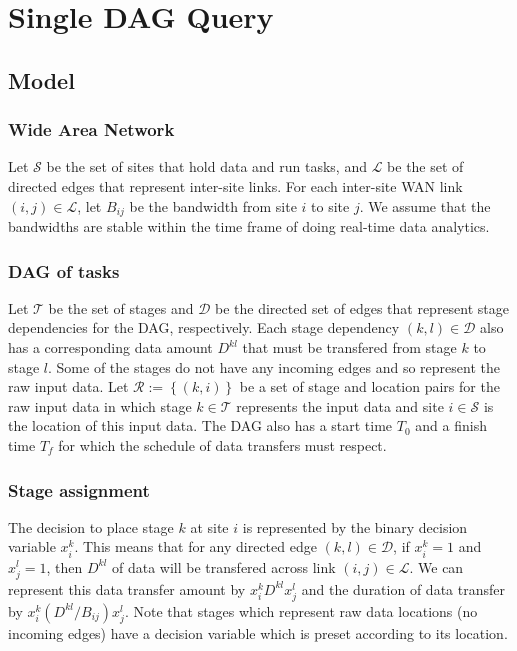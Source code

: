 \section{Single DAG Query}

\subsection{Model}

\subsubsection*{Wide Area Network}

Let $\mathcal{S}$ be the set of sites that hold data and run tasks, and $\mathcal{L}$ be the set of directed edges that represent inter-site links.
For each inter-site WAN link $(i,j)\in\mathcal{L}$, let $B_{ij}$ be the bandwidth from site $i$ to site $j$.
We assume that the bandwidths are stable within the time frame of doing real-time data analytics.

\subsubsection*{DAG of tasks}

Let $\mathcal{T}$ be the set of stages and $\mathcal{D}$ be the directed set of edges that represent stage dependencies for the DAG, respectively.
Each stage dependency $(k,l)\in\mathcal{D}$ also has a corresponding data amount $D^{kl}$ that must be transfered from stage $k$ to stage $l$.
Some of the stages do not have any incoming edges and so represent the raw input data.
Let $\mathcal{R}:=\left\{(k,i)\right\}$ be a set of stage and location pairs for the raw input data in which stage $k\in\mathcal{T}$ represents the input data and site $i\in\mathcal{S}$ is the location of this input data.
The DAG also has a start time $T_0$ and a finish time $T_f$ for which the schedule of data transfers must respect.

\subsubsection*{Stage assignment}

The decision to place stage $k$ at site $i$ is represented by the binary decision variable $x_i^k$.
This means that for any directed edge $(k,l)\in\mathcal{D}$, if $x_i^k=1$ and $x_j^l=1$, then $D^{kl}$ of data will be transfered across link $(i,j)\in\mathcal{L}$.
We can represent this data transfer amount by $x_i^kD^{kl}x_j^l$ and the duration of data transfer by $x_i^k(D^{kl}/B_{ij})x_j^l$.
Note that stages which represent raw data locations (no incoming edges) have a decision variable which is preset according to its location.


